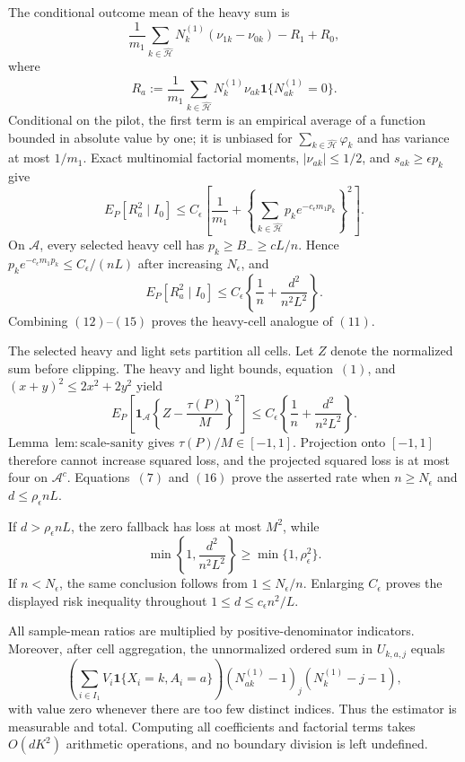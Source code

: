 The conditional outcome mean of the heavy sum is
\[
 \frac1{m_1}\sum_{k\in\widehat{\mathcal H}}N_k^{(1)}
 (\nu_{1k}-\nu_{0k})-R_1+R_0,
\]
where
\[
 R_a:=\frac1{m_1}\sum_{k\in\widehat{\mathcal H}}
 N_k^{(1)}\nu_{ak}\mathbf1\{N_{ak}^{(1)}=0\}.
\tag{13}
\]
Conditional on the pilot, the first term is an empirical average of a function bounded in absolute value by one; it is unbiased for \(\sum_{k\in\widehat{\mathcal H}}\varphi_k\) and has variance at most \(1/m_1\).  Exact multinomial factorial moments, \(|\nu_{ak}|\le1/2\), and \(s_{ak}\ge\epsilon p_k\) give
\[
 E_P[R_a^2\mid I_0]
 \le C_{\epsilon}\left[
 \frac1{m_1}+
 \left\{\sum_{k\in\widehat{\mathcal H}}
 p_ke^{-c_{\epsilon}m_1p_k}\right\}^2
 \right].
\tag{14}
\]
On \(\mathcal A\), every selected heavy cell has \(p_k\ge B_-\ge cL/n\).  Hence \(p_ke^{-c_{\epsilon}m_1p_k}\le C_{\epsilon}/(nL)\) after increasing \(N_{\epsilon}\), and
\[
 E_P[R_a^2\mid I_0]
 \le C_{\epsilon}\left\{\frac1n+
 \frac{d^2}{n^2L^2}\right\}.
\tag{15}
\]
Combining \((12)\)--\((15)\) proves the heavy-cell analogue of \((11)\).

The selected heavy and light sets partition all cells.  Let \(Z\) denote the normalized sum before clipping.  The heavy and light bounds, equation~\((1)\), and \((x+y)^2\le2x^2+2y^2\) yield
\[
 E_P\left[\mathbf1_{\mathcal A}
 \left\{Z-\frac{\tau(P)}M\right\}^2\right]
 \le C_{\epsilon}\left\{\frac1n+
 \frac{d^2}{n^2L^2}\right\}.
\tag{16}
\]
Lemma~\(\mathrm{lem:scale\text{-}sanity}\) gives \(\tau(P)/M\in[-1,1]\).  Projection onto \([-1,1]\) therefore cannot increase squared loss, and the projected squared loss is at most four on \(\mathcal A^c\).  Equations~\((7)\) and \((16)\) prove the asserted rate when \(n\ge N_{\epsilon}\) and \(d\le\rho_{\epsilon}nL\).

If \(d>\rho_{\epsilon}nL\), the zero fallback has loss at most \(M^2\), while
\[
 \min\left\{1,\frac{d^2}{n^2L^2}\right\}
 \ge\min\{1,\rho_{\epsilon}^2\}.
\]
If \(n<N_{\epsilon}\), the same conclusion follows from \(1\le N_{\epsilon}/n\).  Enlarging \(C_{\epsilon}\) proves the displayed risk inequality throughout \(1\le d\le c_{\epsilon}n^2/L\).

All sample-mean ratios are multiplied by positive-denominator indicators.  Moreover, after cell aggregation, the unnormalized ordered sum in \(U_{k,a,j}\) equals
\[
 \left(\sum_{i\in I_1}V_i\mathbf1\{X_i=k,A_i=a\}\right)
 (N_{ak}^{(1)}-1)_j(N_k^{(1)}-j-1),
\]
with value zero whenever there are too few distinct indices.  Thus the estimator is measurable and total.  Computing all coefficients and factorial terms takes \(O(dK^2)\) arithmetic operations, and no boundary division is left undefined.

